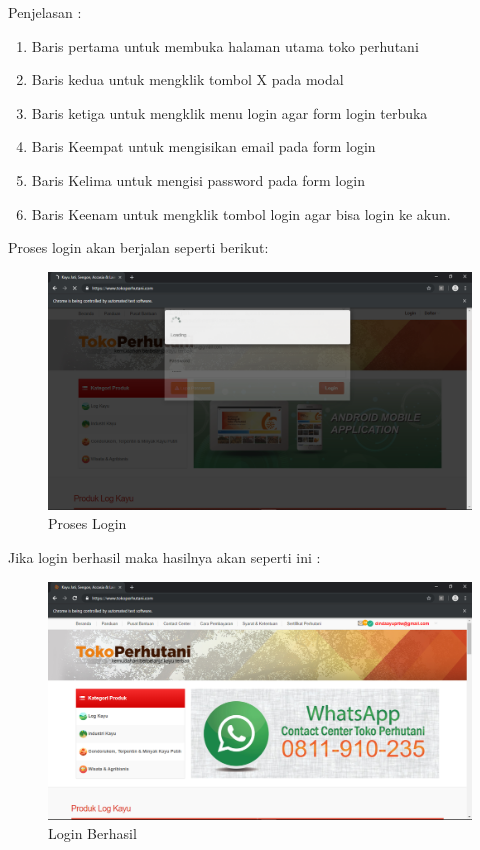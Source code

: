 Penjelasan :
\begin{enumerate}
	\item Baris pertama untuk membuka halaman utama toko perhutani
	\item Baris kedua untuk mengklik tombol X pada modal
	\item Baris ketiga untuk mengklik menu login agar form login terbuka
	\item Baris Keempat untuk mengisikan email pada form login 
	\item Baris Kelima untuk mengisi password pada form login
	\item Baris Keenam untuk mengklik tombol login agar bisa login ke akun.
\end{enumerate}

\newpage
Proses login akan berjalan seperti berikut:
\begin{figure}[h]
	\centering
	\includegraphics[scale=0.28]{figures/1login}
	\caption{Proses Login}
\end{figure}

Jika login berhasil maka hasilnya akan seperti ini :
\begin{figure}[h]
	\centering
	\includegraphics[scale=0.28]{figures/loginn}
	\caption{Login Berhasil}
\end{figure}

